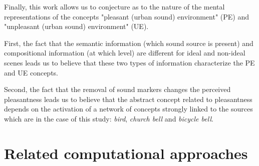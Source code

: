 \documentclass[12pt]{elsarticle}
\newcommand{\eg}{\emph{e.\,g.}}
\begin{document}

Finally, this work allows us to conjecture as to the nature of the mental representations of the concepts "pleasant (urban sound) environment" (PE) and "unpleasant (urban sound) environment" (UE).


First, the fact that the semantic information (which sound source is present) and compositional information (at which level) are different for ideal and non-ideal scenes leads us to believe that these two types of information characterize the PE and UE concepts.


Second, the fact that the removal of sound markers changes the perceived pleasantness leads us to believe that the abstract concept related to pleasantness depends on the activation of a network of concepts strongly linked to the sources which are in the case of this study: \emph{bird}, \emph{church bell} and \emph{bicycle bell}.



\section{Related computational approaches}
\end{document}
